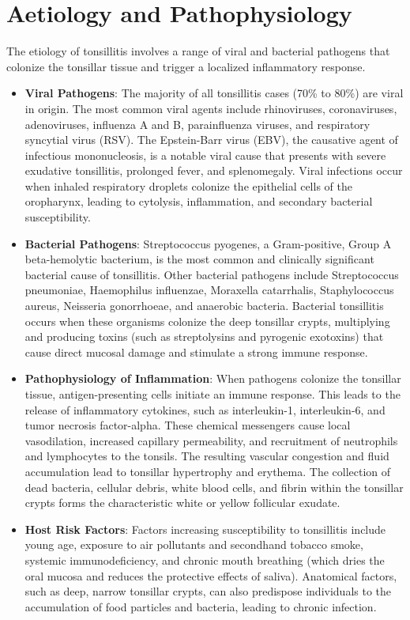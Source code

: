 \section*{Aetiology and Pathophysiology}
The etiology of tonsillitis involves a range of viral and bacterial pathogens that colonize the tonsillar tissue and trigger a localized inflammatory response.
\begin{itemize}
    \item \textbf{Viral Pathogens}: The majority of all tonsillitis cases (70\% to 80\%) are viral in origin. The most common viral agents include rhinoviruses, coronaviruses, adenoviruses, influenza A and B, parainfluenza viruses, and respiratory syncytial virus (RSV). The Epstein-Barr virus (EBV), the causative agent of infectious mononucleosis, is a notable viral cause that presents with severe exudative tonsillitis, prolonged fever, and splenomegaly. Viral infections occur when inhaled respiratory droplets colonize the epithelial cells of the oropharynx, leading to cytolysis, inflammation, and secondary bacterial susceptibility.
    \item \textbf{Bacterial Pathogens}: Streptococcus pyogenes, a Gram-positive, Group A beta-hemolytic bacterium, is the most common and clinically significant bacterial cause of tonsillitis. Other bacterial pathogens include Streptococcus pneumoniae, Haemophilus influenzae, Moraxella catarrhalis, Staphylococcus aureus, Neisseria gonorrhoeae, and anaerobic bacteria. Bacterial tonsillitis occurs when these organisms colonize the deep tonsillar crypts, multiplying and producing toxins (such as streptolysins and pyrogenic exotoxins) that cause direct mucosal damage and stimulate a strong immune response.
    \item \textbf{Pathophysiology of Inflammation}: When pathogens colonize the tonsillar tissue, antigen-presenting cells initiate an immune response. This leads to the release of inflammatory cytokines, such as interleukin-1, interleukin-6, and tumor necrosis factor-alpha. These chemical messengers cause local vasodilation, increased capillary permeability, and recruitment of neutrophils and lymphocytes to the tonsils. The resulting vascular congestion and fluid accumulation lead to tonsillar hypertrophy and erythema. The collection of dead bacteria, cellular debris, white blood cells, and fibrin within the tonsillar crypts forms the characteristic white or yellow follicular exudate.
    \item \textbf{Host Risk Factors}: Factors increasing susceptibility to tonsillitis include young age, exposure to air pollutants and secondhand tobacco smoke, systemic immunodeficiency, and chronic mouth breathing (which dries the oral mucosa and reduces the protective effects of saliva). Anatomical factors, such as deep, narrow tonsillar crypts, can also predispose individuals to the accumulation of food particles and bacteria, leading to chronic infection.
\end{itemize}

